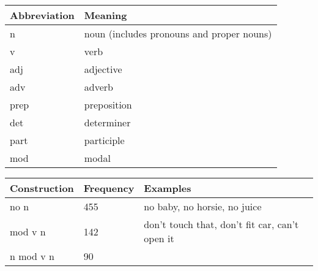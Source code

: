 \documentclass[man]{apa6}
\begin{document}
\begin{longtable}[]{@{}ll@{}}
\toprule
Abbreviation & Meaning\tabularnewline
\midrule
\endhead
n & noun (includes pronouns and proper nouns)\tabularnewline
v & verb\tabularnewline
adj & adjective\tabularnewline
adv & adverb\tabularnewline
prep & preposition\tabularnewline
det & determiner\tabularnewline
part & participle\tabularnewline
mod & modal\tabularnewline
\bottomrule
\end{longtable}

\begin{longtable}[]{@{}lll@{}}
\toprule
\begin{minipage}[b]{0.23\columnwidth}\raggedright\strut
Construction\strut
\end{minipage} & \begin{minipage}[b]{0.15\columnwidth}\raggedright\strut
Frequency\strut
\end{minipage} & \begin{minipage}[b]{0.47\columnwidth}\raggedright\strut
Examples\strut
\end{minipage}\tabularnewline
\midrule
\endhead
\begin{minipage}[t]{0.23\columnwidth}\raggedright\strut
no n\strut
\end{minipage} & \begin{minipage}[t]{0.15\columnwidth}\raggedright\strut
455\strut
\end{minipage} & \begin{minipage}[t]{0.47\columnwidth}\raggedright\strut
no baby, no horsie, no juice\strut
\end{minipage}\tabularnewline
\begin{minipage}[t]{0.23\columnwidth}\raggedright\strut
mod v n\strut
\end{minipage} & \begin{minipage}[t]{0.15\columnwidth}\raggedright\strut
142\strut
\end{minipage} & \begin{minipage}[t]{0.47\columnwidth}\raggedright\strut
don't touch that, don't fit car, can't open it\strut
\end{minipage}\tabularnewline
\begin{minipage}[t]{0.23\columnwidth}\raggedright\strut
n mod v n\strut
\end{minipage} & \begin{minipage}[t]{0.15\columnwidth}\raggedright\strut
90\strut
\end{minipage} & \begin{minipage}[t]{0.47\columnwidth}\raggedright\strut

\end{minipage}
\end{longtable}
\end{document}
